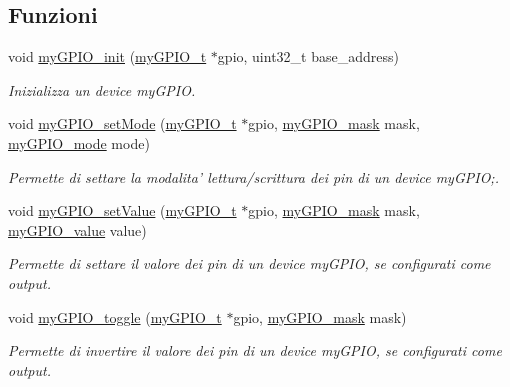 \subsection*{Funzioni}
\begin{DoxyCompactItemize}
\item 
void \hyperlink{group__my_g_p_i_o_ga8fda7ca73b187baf256409423c25d725}{my\+G\+P\+I\+O\+\_\+init} (\hyperlink{structmy_g_p_i_o__t}{my\+G\+P\+I\+O\+\_\+t} $\ast$gpio, uint32\+\_\+t base\+\_\+address)
\begin{DoxyCompactList}\small\item\em Inizializza un device my\+G\+P\+I\+O. \end{DoxyCompactList}\item 
void \hyperlink{group__my_g_p_i_o_ga38a2ea04d07af50f7f570f0367594c8b}{my\+G\+P\+I\+O\+\_\+set\+Mode} (\hyperlink{structmy_g_p_i_o__t}{my\+G\+P\+I\+O\+\_\+t} $\ast$gpio, \hyperlink{group__my_g_p_i_o_ga402a0d20afc0cb7c25554b8b023f4253}{my\+G\+P\+I\+O\+\_\+mask} mask, \hyperlink{group__my_g_p_i_o_ga76b849f0e0c05e7f9161bdb33396f2b1}{my\+G\+P\+I\+O\+\_\+mode} mode)
\begin{DoxyCompactList}\small\item\em Permette di settare la modalita' lettura/scrittura dei pin di un device my\+G\+P\+I\+O;. \end{DoxyCompactList}\item 
void \hyperlink{group__my_g_p_i_o_gab742e68093ad4c90fe299b64fd6736ca}{my\+G\+P\+I\+O\+\_\+set\+Value} (\hyperlink{structmy_g_p_i_o__t}{my\+G\+P\+I\+O\+\_\+t} $\ast$gpio, \hyperlink{group__my_g_p_i_o_ga402a0d20afc0cb7c25554b8b023f4253}{my\+G\+P\+I\+O\+\_\+mask} mask, \hyperlink{group__my_g_p_i_o_gaf634fe4a0e1eab8da5000b72d6ad362b}{my\+G\+P\+I\+O\+\_\+value} value)
\begin{DoxyCompactList}\small\item\em Permette di settare il valore dei pin di un device my\+G\+P\+I\+O, se configurati come output. \end{DoxyCompactList}\item 
void \hyperlink{group__my_g_p_i_o_ga27ea411bf51a58fe48eb8c5036780b53}{my\+G\+P\+I\+O\+\_\+toggle} (\hyperlink{structmy_g_p_i_o__t}{my\+G\+P\+I\+O\+\_\+t} $\ast$gpio, \hyperlink{group__my_g_p_i_o_ga402a0d20afc0cb7c25554b8b023f4253}{my\+G\+P\+I\+O\+\_\+mask} mask)
\begin{DoxyCompactList}\small\item\em Permette di invertire il valore dei pin di un device my\+G\+P\+I\+O, se configurati come output. \end{DoxyCompactList}\item 

\end{DoxyCompactItemize}
